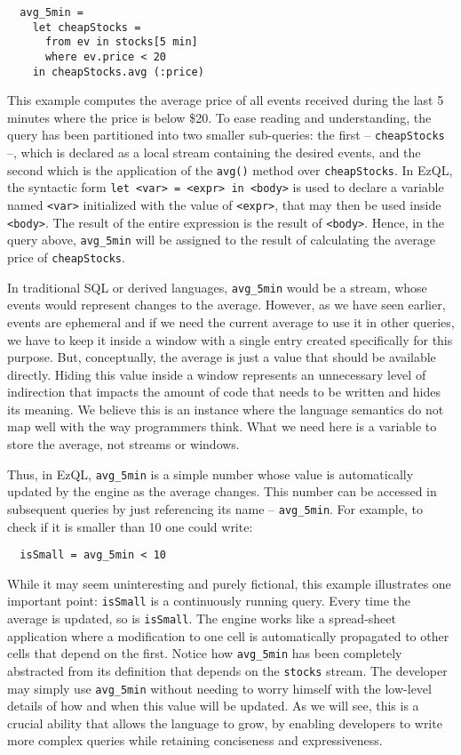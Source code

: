 \documentclass[a4,11pt]{report}
\begin{document}
\begin{lstlisting}
  avg_5min =
    let cheapStocks =
      from ev in stocks[5 min]
      where ev.price < 20
    in cheapStocks.avg (:price)
\end{lstlisting}


This example computes the average price of all events received during
the last 5 minutes where the price is below \$20. To ease reading and
understanding, the query has been partitioned into two smaller
sub-queries: the first -- \verb=cheapStocks= --, which is declared as
a local stream containing the desired events, and the second which is
the application of the \verb=avg()= method over \verb=cheapStocks=. In
EzQL, the syntactic form \verb!let <var> = <expr> in <body>! is used
to declare a variable named \verb=<var>= initialized with the value of
\verb=<expr>=, that may then be used inside \verb=<body>=. The result
of the entire expression is the result of \verb=<body>=. Hence, in the
query above, \verb=avg_5min= will be assigned to the result of
calculating the average price of \verb=cheapStocks=.

In traditional SQL or derived languages, \verb=avg_5min= would be a
stream, whose events would represent changes to the average. However,
as we have seen earlier, events are ephemeral and if we need the
current average to use it in other queries, we have to keep it inside
a window with a single entry created specifically for this
purpose. But, conceptually, the average is just a value that should be
available directly. Hiding this value inside a window represents an
unnecessary level of indirection that impacts the amount of code that
needs to be written and hides its meaning.  We believe this is an
instance where the language semantics do not map well with the way
programmers think. What we need here is a variable to store the
average, not streams or windows.

Thus, in EzQL, \verb=avg_5min= is a simple number whose value is
automatically updated by the engine as the average changes. This
number can be accessed in subsequent queries by just referencing its
name -- \verb=avg_5min=. For example, to check if it is smaller than
10 one could write:

\begin{lstlisting}
  isSmall = avg_5min < 10
\end{lstlisting}

While it may seem uninteresting and purely fictional, this example
illustrates one important point: \verb=isSmall= is a continuously
running query. Every time the average is updated, so is
\verb=isSmall=. The engine works like a spread-sheet application where
a modification to one cell is automatically propagated to other cells
that depend on the first. Notice how \verb=avg_5min= has been
completely abstracted from its definition that depends on the
\verb=stocks= stream. The developer may simply use \verb=avg_5min=
without needing to worry himself with the low-level details of how and
when this value will be updated. As we will see, this is a crucial
ability that allows the language to grow, by enabling developers to
write more complex queries while retaining conciseness and
expressiveness.
\end{document}
